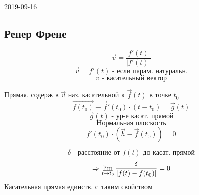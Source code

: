 \documentclass[main]{subfiles}
\begin{document}
\begin{lect} {2019-09-16}
	\subsection{Репер Френе}
		\begin{Definition}
			\[\vec{v} = \frac{f'(t)}{|f'(t)|}\]
			\[\vec{v} = f'(t) \text{ - если парам. натуральн.}\]
			\[v \text{ - касательный вектор}\]
		\end{Definition}

		\begin{Definition}
			Прямая, содерж в $\vec{v}$ наз. касательной к $\vec{f}(t)$ в точке $t_0$
			\[\vec{f(t_0)} + \vec{f}'(t_0) \cdot (t - t_0) = \vec{g}(t)\]
			\[\vec{g}(t) \text{ - ур-е касат. прямой}\]
			\[\text{Нормальная плоскость}\]
			\[f'(t_0) \cdot (\vec{h} - \vec{f}(t_0)) = 0\]
		\end{Definition}

		\begin{Theorem}
			\[\delta \text{ - расстояние от }f(t) \text{ до касат. прямой}\]
			\[\Rightarrow \lim_{t \to t_0} \frac{\delta}{|f(t) - f(t_0)|} = 0 \]
			Касательная прямая единств. с таким свойством
		\end{Theorem}
	\end{lect}
\end{document}
